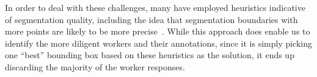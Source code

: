 \par In order to deal with these challenges, many have employed heuristics indicative of segmentation quality, including the idea that segmentation boundaries with more points are likely to be more precise~\cite{Cabezas2015,Sameki2015,Sorokin2008}.%
While this approach does enable us to identify the more diligent workers and their annotations, since it is simply picking one ``best'' bounding box based on these heuristics as the solution, it ends up discarding the majority of the worker responses. 
